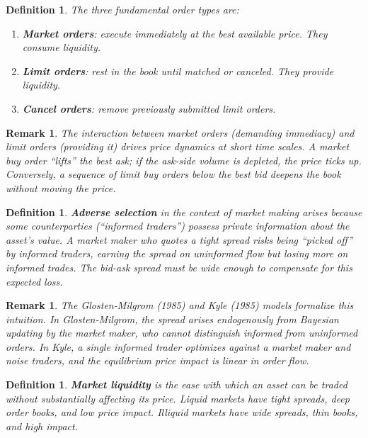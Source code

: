 \documentclass{report}
\theoremstyle{spacedplain}
\theoremstyle{spaceddefinition}
\newtheorem{definition}[theorem]{Definition}
\theoremstyle{spacedremark}
\newtheorem{remark}[theorem]{Remark}
\begin{document}
\begin{definition}
The three fundamental order types are:
\begin{enumerate}
    \item \textbf{Market orders}: execute immediately at the best available price. They consume liquidity.
    \item \textbf{Limit orders}: rest in the book until matched or canceled. They provide liquidity.
    \item \textbf{Cancel orders}: remove previously submitted limit orders.
\end{enumerate}
\end{definition}

\begin{remark}
The interaction between market orders (demanding immediacy) and limit orders (providing it) drives price dynamics at short time scales. A market buy order ``lifts'' the best ask; if the ask-side volume is depleted, the price ticks up. Conversely, a sequence of limit buy orders below the best bid deepens the book without moving the price.
\end{remark}

\begin{definition}
\textbf{Adverse selection} in the context of market making arises because some counterparties (``informed traders'') possess private information about the asset's value. A market maker who quotes a tight spread risks being ``picked off'' by informed traders, earning the spread on uninformed flow but losing more on informed trades. The bid-ask spread must be wide enough to compensate for this expected loss.
\end{definition}

\begin{remark}
The Glosten-Milgrom (1985) and Kyle (1985) models formalize this intuition. In Glosten-Milgrom, the spread arises endogenously from Bayesian updating by the market maker, who cannot distinguish informed from uninformed orders. In Kyle, a single informed trader optimizes against a market maker and noise traders, and the equilibrium price impact is linear in order flow.
\end{remark}

\begin{definition}
\textbf{Market liquidity} is the ease with which an asset can be traded without substantially affecting its price. Liquid markets have tight spreads, deep order books, and low price impact. Illiquid markets have wide spreads, thin books, and high impact.
\end{definition}
\end{document}
